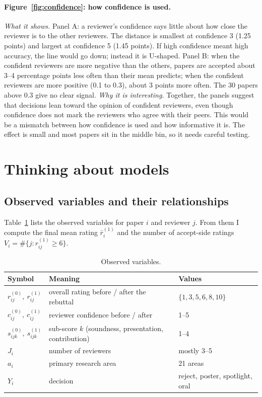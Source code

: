 \documentclass[11pt]{article}
\begin{document}
\paragraph{Figure~\ref{fig:confidence}: how confidence is used.}
\emph{What it shows.} Panel A: a reviewer's confidence says little about how close the reviewer is to the other reviewers. The distance is smallest at confidence 3 (1.25 points) and largest at confidence 5 (1.45 points). If high confidence meant high accuracy, the line would go down; instead it is U-shaped. Panel B: when the confident reviewers are more negative than the others, papers are accepted about 3--4 percentage points less often than their mean predicts; when the confident reviewers are more positive (0.1 to 0.3), about 3 points more often. The 30 papers above 0.3 give no clear signal.
\emph{Why it is interesting.} Together, the panels suggest that decisions lean toward the opinion of confident reviewers, even though confidence does not mark the reviewers who agree with their peers. This would be a mismatch between how confidence is used and how informative it is. The effect is small and most papers sit in the middle bin, so it needs careful testing.

\section{Thinking about models}
\label{sec:models}

\subsection{Observed variables and their relationships}

Table~\ref{tab:vars} lists the observed variables for paper $i$ and reviewer $j$. From them I compute the final mean rating $\bar r^{(1)}_i$ and the number of accept-side ratings $V_i=\#\{j: r^{(1)}_{ij}\ge 6\}$.

\begin{table}[h]
\centering\small
\begin{tabular}{lll}
\toprule
Symbol & Meaning & Values \\
\midrule
$r^{(0)}_{ij},\ r^{(1)}_{ij}$ & overall rating before / after the rebuttal & $\{1,3,5,6,8,10\}$ \\
$c^{(0)}_{ij},\ c^{(1)}_{ij}$ & reviewer confidence before / after & 1--5 \\
$s^{(0)}_{ijk},\ s^{(1)}_{ijk}$ & sub-score $k$ (soundness, presentation, contribution) & 1--4 \\
$J_i$ & number of reviewers & mostly 3--5 \\
$a_i$ & primary research area & 21 areas \\
$Y_i$ & decision & reject, poster, spotlight, oral \\
\bottomrule
\end{tabular}
\caption{Observed variables.}
\label{tab:vars}
\end{table}
\end{document}
